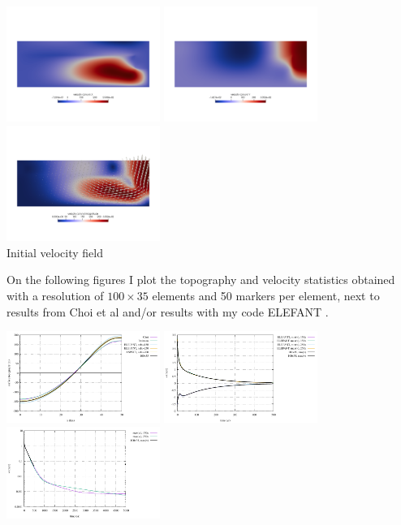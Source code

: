 \begin{center}
\includegraphics[width=5cm]{python_codes/fieldstone_64/results/flexureplate/u.png}
\includegraphics[width=5cm]{python_codes/fieldstone_64/results/flexureplate/v.png}
\includegraphics[width=5cm]{python_codes/fieldstone_64/results/flexureplate/vel.png}\\
{\captionfont Initial velocity field}
\end{center}

On the following figures I plot the topography and velocity statistics obtained with 
a resolution of $100\times35$ elements and 50 markers per element, next to 
results from Choi et al and/or results with my code ELEFANT \cite{thie14}.  
\begin{center}
\includegraphics[width=5cm]{python_codes/fieldstone_64/results/flexureplate/topo.pdf}
\includegraphics[width=5cm]{python_codes/fieldstone_64/results/flexureplate/v.pdf}
\includegraphics[width=5cm]{python_codes/fieldstone_64/results/flexureplate/v_log.pdf}
\end{center}

